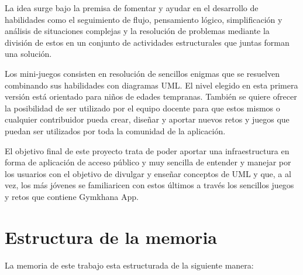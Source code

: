 \documentclass[a4paper, 12pt]{book}
\begin{document}
La idea surge bajo la premisa de fomentar y ayudar en el desarrollo de habilidades como el seguimiento de flujo, pensamiento lógico, simplificación y análisis de situaciones complejas y la resolución de problemas mediante la división de estos en un conjunto de actividades estructurales que juntas forman una solución. 

Los mini-juegos consisten en resolución de sencillos enigmas que se resuelven combinando sus habilidades con diagramas UML. El nivel elegido en esta primera versión está orientado para niños de edades tempranas. También se quiere ofrecer la posibilidad de ser utilizado por el equipo docente para que estos mismos o cualquier contribuidor pueda crear, diseñar y aportar nuevos retos y juegos que puedan ser utilizados por toda la comunidad de la aplicación. 

El objetivo final de este proyecto trata de poder aportar una infraestructura en forma de aplicación de acceso público y muy sencilla de entender y manejar por los usuarios con el objetivo de divulgar y enseñar conceptos de UML y que, a al vez, los más jóvenes se familiaricen con estos últimos a través los sencillos juegos y retos que contiene Gymkhana App. 


\section{Estructura de la memoria}
\label{sec:estructura}

La memoria de este trabajo esta estructurada de la siguiente manera: 
\end{document}
